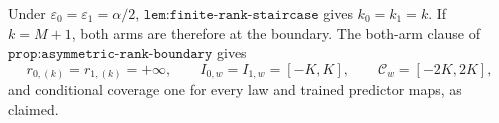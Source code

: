 Under \(\varepsilon_0=\varepsilon_1=\alpha/2\), \(\texttt{lem:finite-rank-staircase}\) gives \(k_0=k_1=k\). If \(k=M+1\), both arms are therefore at the boundary. The both-arm clause of \(\texttt{prop:asymmetric-rank-boundary}\) gives
\[
r_{0,(k)}=r_{1,(k)}=+\infty,
\qquad
I_{0,w}=I_{1,w}=[-K,K],
\qquad
\mathcal C_w=[-2K,2K],
\]
and conditional coverage one for every law and trained predictor maps, as claimed.